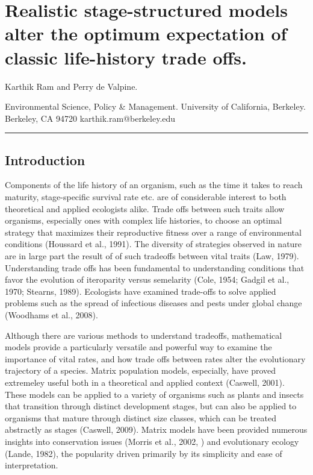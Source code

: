 \documentclass[]{article}
\author{}
\date{}
\begin{document}
\section{Realistic stage-structured models alter the optimum expectation
of classic life-history trade offs.}

Karthik Ram and Perry de Valpine.

Environmental Science, Policy \& Management. University of California,
Berkeley. Berkeley, CA 94720 karthik.ram@berkeley.edu

\begin{center}\rule{3in}{0.4pt}\end{center}

\subsection{Introduction}

Components of the life history of an organism, such as the time it takes
to reach maturity, stage-specific survival rate etc. are of considerable
interest to both theoretical and applied ecologists alike. Trade offs
between such traits allow organisms, especially ones with complex life
histories, to choose an optimal strategy that maximizes their
reproductive fitness over a range of environmental conditions (Houssard
et al., 1991). The diversity of strategies observed in nature are in
large part the result of of such tradeoffs between vital traits (Law,
1979). Understanding trade offs has been fundamental to understanding
conditions that favor the evolution of iteroparity versus semelarity
(Cole, 1954; Gadgil et al., 1970; Stearns, 1989). Ecologists have
examined trade-offs to solve applied problems such as the spread of
infectious diseases and pests under global change (Woodhams et al.,
2008).

Although there are various methods to understand tradeoffs, mathematical
models provide a particularly versatile and powerful way to examine the
importance of vital rates, and how trade offs between rates alter the
evolutionary trajectory of a species. Matrix population models,
especially, have proved extremeley useful both in a theoretical and
applied context (Caswell, 2001). These models can be applied to a
variety of organisms such as plants and insects that transition through
distinct development stages, but can also be applied to organisms that
mature through distinct size classes, which can be treated abstractly as
stages (Caswell, 2009). Matrix models have been provided numerous
insights into conservation issues (Morris et al., 2002, ) and
evolutionary ecology (Lande, 1982), the popularity driven primarily by
its simplicity and ease of interpretation.
\end{document}
